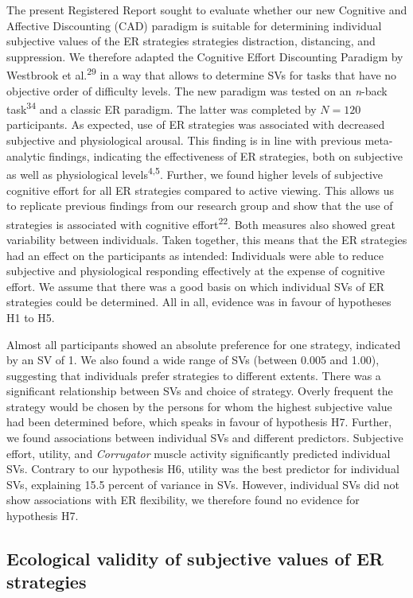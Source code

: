 \documentclass[
  man,floatsintext]{apa6}
\begin{document}
The present Registered Report sought to evaluate whether our new Cognitive and Affective Discounting (CAD) paradigm is suitable for determining individual subjective values of the ER strategies strategies distraction, distancing, and suppression.
We therefore adapted the Cognitive Effort Discounting Paradigm by Westbrook et al.\textsuperscript{29} in a way that allows to determine SVs for tasks that have no objective order of difficulty levels.
The new paradigm was tested on an \emph{n}-back task\textsuperscript{34} and a classic ER paradigm.
The latter was completed by \(N=120\) participants.
As expected, use of ER strategies was associated with decreased subjective and physiological arousal.
This finding is in line with previous meta-analytic findings, indicating the effectiveness of ER strategies, both on subjective as well as physiological levels\textsuperscript{4,5}.
Further, we found higher levels of subjective cognitive effort for all ER strategies compared to active viewing.
This allows us to replicate previous findings from our research group and show that the use of strategies is associated with cognitive effort\textsuperscript{22}.
Both measures also showed great variability between individuals.
Taken together, this means that the ER strategies had an effect on the participants as intended: Individuals were able to reduce subjective and physiological responding effectively at the expense of cognitive effort.
We assume that there was a good basis on which individual SVs of ER strategies could be determined.
All in all, evidence was in favour of hypotheses H1 to H5.

Almost all participants showed an absolute preference for one strategy, indicated by an SV of 1.
We also found a wide range of SVs (between 0.005 and 1.00), suggesting that individuals prefer strategies to different extents.
There was a significant relationship between SVs and choice of strategy.
Overly frequent the strategy would be chosen by the persons for whom the highest subjective value had been determined before, which speaks in favour of hypothesis H7.
Further, we found associations between individual SVs and different predictors.
Subjective effort, utility, and \emph{Corrugator} muscle activity significantly predicted individual SVs.
Contrary to our hypothesis H6, utility was the best predictor for individual SVs, explaining 15.5 percent of variance in SVs.
However, individual SVs did not show associations with ER flexibility, we therefore found no evidence for hypothesis H7.

\hypertarget{ecological-validity-of-subjective-values-of-er-strategies}{%
\subsection{Ecological validity of subjective values of ER strategies}\label{ecological-validity-of-subjective-values-of-er-strategies}}
\end{document}
